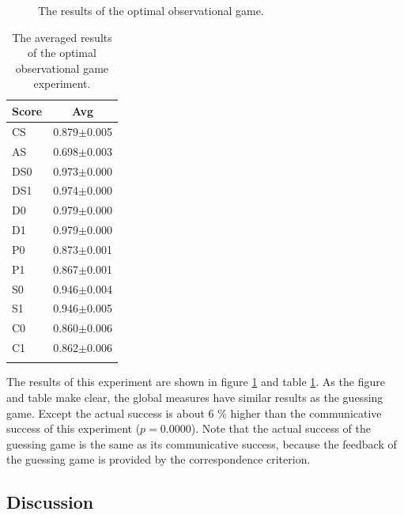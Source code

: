 \begin{figure}
\centering
{}
\caption{The results of the optimal observational game.}
\label{f:opt:plotoli}
\end{figure}

\begin{table}
\centering
\begin{tabular}{lc}
\lsptoprule
Score & Avg \\\midrule
CS & 0.879$\pm$0.005\\%
AS & 0.698$\pm$0.003\\%
DS0 & 0.973$\pm$0.000\\%
DS1 & 0.974$\pm$0.000\\%
D0 & 0.979$\pm$0.000 \\%
D1 & 0.979$\pm$0.000 \\%
P0 & 0.873$\pm$0.001\\%
P1 & 0.867$\pm$0.001\\%
S0 & 0.946$\pm$0.004\\%
S1 & 0.946$\pm$0.005\\%
C0 & 0.860$\pm$0.006\\%
C1 & 0.862$\pm$0.006\\%
\lspbottomrule
\end{tabular}
\caption{The averaged results of the optimal observational game experiment.}
\label{t:opt:oli1}
\end{table}

The results of this experiment are shown in figure \ref{f:opt:plotoli} and table \ref{t:opt:oli1}. As the figure and table make clear, the global measures have similar results as the guessing game. Except the actual success is about 6 \% higher than the communicative success of this experiment ($p=0.0000$). Note that the actual success of the guessing game is the same as its communicative success, because the feedback of the guessing game is provided by the correspondence criterion. 

\subsection{Discussion}

